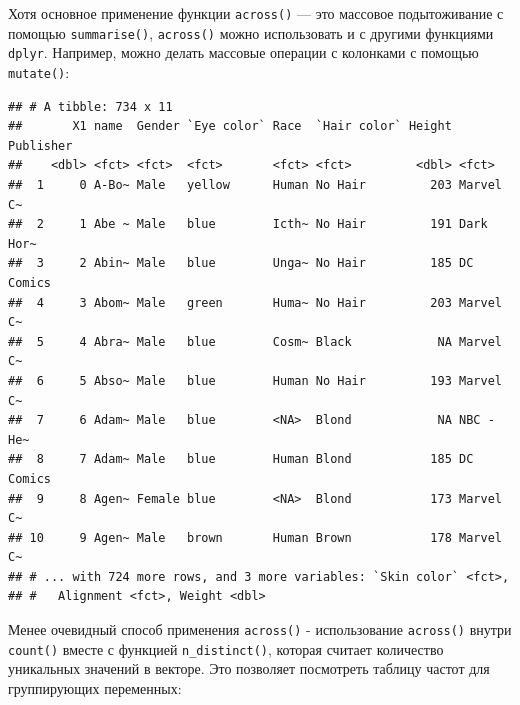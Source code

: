 \documentclass[]{book}
\newenvironment{Shaded}{\begin{snugshade}}{\end{snugshade}}
\newcommand{\KeywordTok}[1]{\textcolor[rgb]{0.13,0.29,0.53}{\textbf{#1}}}
\newcommand{\DecValTok}[1]{\textcolor[rgb]{0.00,0.00,0.81}{#1}}
\newcommand{\StringTok}[1]{\textcolor[rgb]{0.31,0.60,0.02}{#1}}
\newcommand{\ControlFlowTok}[1]{\textcolor[rgb]{0.13,0.29,0.53}{\textbf{#1}}}
\newcommand{\OperatorTok}[1]{\textcolor[rgb]{0.81,0.36,0.00}{\textbf{#1}}}
\newcommand{\NormalTok}[1]{#1}
\begin{document}
Хотя основное применение функции \texttt{across()} --- это массовое
подытоживание с помощью \texttt{summarise()}, \texttt{across()} можно
использовать и с другими функциями \texttt{dplyr}. Например, можно
делать массовые операции с колонками с помощью \texttt{mutate()}:

\begin{Shaded}
\end{Shaded}

\begin{verbatim}
## # A tibble: 734 x 11
##       X1 name  Gender `Eye color` Race  `Hair color` Height Publisher
##    <dbl> <fct> <fct>  <fct>       <fct> <fct>         <dbl> <fct>    
##  1     0 A-Bo~ Male   yellow      Human No Hair         203 Marvel C~
##  2     1 Abe ~ Male   blue        Icth~ No Hair         191 Dark Hor~
##  3     2 Abin~ Male   blue        Unga~ No Hair         185 DC Comics
##  4     3 Abom~ Male   green       Huma~ No Hair         203 Marvel C~
##  5     4 Abra~ Male   blue        Cosm~ Black            NA Marvel C~
##  6     5 Abso~ Male   blue        Human No Hair         193 Marvel C~
##  7     6 Adam~ Male   blue        <NA>  Blond            NA NBC - He~
##  8     7 Adam~ Male   blue        Human Blond           185 DC Comics
##  9     8 Agen~ Female blue        <NA>  Blond           173 Marvel C~
## 10     9 Agen~ Male   brown       Human Brown           178 Marvel C~
## # ... with 724 more rows, and 3 more variables: `Skin color` <fct>,
## #   Alignment <fct>, Weight <dbl>
\end{verbatim}

Менее очевидный способ применения \texttt{across()} - использование
\texttt{across()} внутри \texttt{count()} вместе с функцией
\texttt{n\_distinct()}, которая считает количество уникальных значений в
векторе. Это позволяет посмотреть таблицу частот для группирующих
переменных:

\begin{Shaded}
\end{Shaded}
\end{document}

